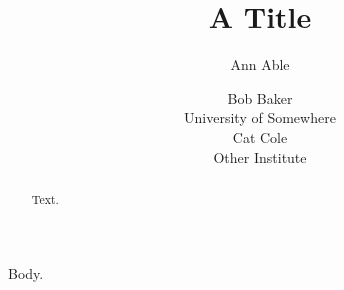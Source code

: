 \documentclass{llncs}
\begin{document}
\title{A Title}
\author{Ann Able \and Bob Baker\\ University of Somewhere\\ Cat Cole\\ Other Institute}
\maketitle
\begin{abstract}Text.\end{abstract}
Body.
\end{document}
